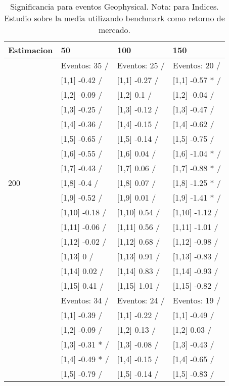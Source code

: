 \begin{table}

\caption{Significancia para eventos Geophysical. Nota: para Indices. Estudio sobre la media utilizando benchmark como retorno de mercado.}
\centering
\begin{tabular}[t]{llll}
\toprule
Estimacion & 50 & 100 & 150\\
\midrule
 & Eventos:  35 / & Eventos:  25 / & Eventos:  20 /\\
 & {}[1,1] -0.42  / & {}[1,1] -0.27  / & {}[1,1] -0.57 * /\\
 & {}[1,2] -0.09  / & {}[1,2] 0.1  / & {}[1,2] -0.04  /\\
 & {}[1,3] -0.25  / & {}[1,3] -0.12  / & {}[1,3] -0.47  /\\
 & {}[1,4] -0.36  / & {}[1,4] -0.15  / & {}[1,4] -0.62  /\\
\addlinespace
 & {}[1,5] -0.65  / & {}[1,5] -0.14  / & {}[1,5] -0.75  /\\
 & {}[1,6] -0.55  / & {}[1,6] 0.04  / & {}[1,6] -1.04 * /\\
 & {}[1,7] -0.43  / & {}[1,7] 0.06  / & {}[1,7] -0.88 * /\\
200 & {}[1,8] -0.4  / & {}[1,8] 0.07  / & {}[1,8] -1.25 * /\\
 & {}[1,9] -0.52  / & {}[1,9] 0.01  / & {}[1,9] -1.41 * /\\
\addlinespace
 & {}[1,10] -0.18  / & {}[1,10] 0.54  / & {}[1,10] -1.12  /\\
 & {}[1,11] -0.06  / & {}[1,11] 0.56  / & {}[1,11] -1.01  /\\
 & {}[1,12] -0.02  / & {}[1,12] 0.68  / & {}[1,12] -0.98  /\\
 & {}[1,13] 0  / & {}[1,13] 0.91  / & {}[1,13] -0.83  /\\
 & {}[1,14] 0.02  / & {}[1,14] 0.83  / & {}[1,14] -0.93  /\\
\addlinespace
 & {}[1,15] 0.41  / & {}[1,15] 1.01  / & {}[1,15] -0.82  /\\
 & Eventos:  34 / & Eventos:  24 / & Eventos:  19 /\\
 & {}[1,1] -0.39  / & {}[1,1] -0.22  / & {}[1,1] -0.49  /\\
 & {}[1,2] -0.09  / & {}[1,2] 0.13  / & {}[1,2] 0.03  /\\
 & {}[1,3] -0.31 * / & {}[1,3] -0.08  / & {}[1,3] -0.43  /\\
\addlinespace
 & {}[1,4] -0.49 * / & {}[1,4] -0.15  / & {}[1,4] -0.65  /\\
 & {}[1,5] -0.79  / & {}[1,5] -0.14  / & {}[1,5] -0.83  /\\

\end{tabular}
\end{table}
